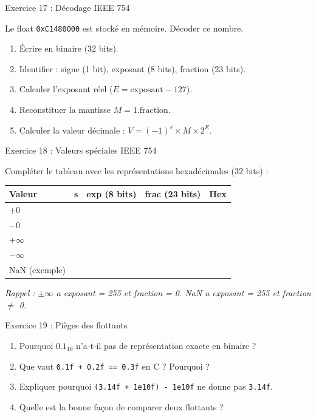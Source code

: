 \documentclass[10pt,a4paper]{article}
\begin{document}
\begin{exercicebox}{Exercice 17 : Décodage IEEE 754}

Le float \texttt{0xC1480000} est stocké en mémoire. Décoder ce nombre.

\begin{enumerate}[label=\alph*)]
    \item Écrire en binaire (32 bits).
    \item Identifier : signe (1 bit), exposant (8 bits), fraction (23 bits).
    \item Calculer l'exposant réel ($E = \text{exposant} - 127$).
    \item Reconstituer la mantisse $M = 1.\text{fraction}$.
    \item Calculer la valeur décimale : $V = (-1)^s \times M \times 2^E$.
\end{enumerate}
\end{exercicebox}

\begin{exercicebox}{Exercice 18 : Valeurs spéciales IEEE 754}

Compléter le tableau avec les représentations hexadécimales (32 bits) :

\begin{center}
\begin{tabular}{|l|c|c|c|c|}
\hline
\textbf{Valeur} & \textbf{s} & \textbf{exp (8 bits)} & \textbf{frac (23 bits)} & \textbf{Hex} \\
\hline
$+0$ & & & & \\
\hline
$-0$ & & & & \\
\hline
$+\infty$ & & & & \\
\hline
$-\infty$ & & & & \\
\hline
NaN (exemple) & & & & \\
\hline
\end{tabular}
\end{center}

\textit{Rappel : $\pm\infty$ a exposant = 255 et fraction = 0. NaN a exposant = 255 et fraction $\neq$ 0.}
\end{exercicebox}

\begin{exercicebox}{Exercice 19 : Pièges des flottants}

\begin{enumerate}[label=\alph*)]
    \item Pourquoi $0.1_{10}$ n'a-t-il pas de représentation exacte en binaire ?
    \item Que vaut \texttt{0.1f + 0.2f == 0.3f} en C ? Pourquoi ?
    \item Expliquer pourquoi \texttt{(3.14f + 1e10f) - 1e10f} ne donne pas \texttt{3.14f}.
    \item Quelle est la bonne façon de comparer deux flottants ?
\end{enumerate}
\end{exercicebox}
\end{document}
